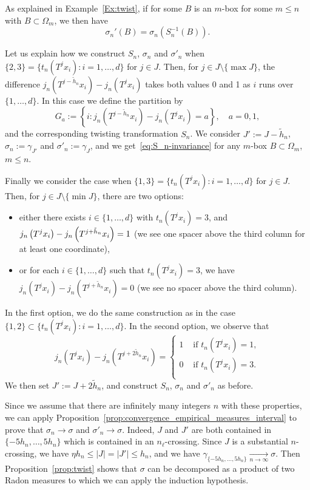 \documentclass[10pt]{amsart}
\theoremstyle{definition}\newtheorem{defi}[theo]{Definition}\newtheorem{rema}[theo]{Remark}\newtheorem{exam}[theo]{Example}\newtheorem{exem}[theo]{Example}\newtheorem{nota}[theo]{Notation}
\newcommand{\egdef}{:=}
\newcommand{\tend}[3][]{\xrightarrow[#2\to#3]{#1}}
\newcommand{\ovC}{\Omega}
\begin{document}
As explained in Example~\ref{Ex:twist}, if for some $B$ is an $m$-box for some $m\le n$ with $B\subset \ovC_m$, we then have
\begin{equation}\label{eq:S_n-invariance}
\sigma_n'(B)=\sigma_n(S_n^{-1}(B)).
\end{equation}


Let us explain how we construct $S_n$, $\sigma_n$ and $\sigma'_n$ when $\{2,3\}= \{t_n(T^j x_i):i=1,\ldots,d\}$ for $j\in J$. Then, for $j\in J\setminus\{\max J\}$, the difference $j_n\left(T^{j-\tilde h_n}x_i\right) - j_n\left(T^{j}x_i\right)$ takes both values 0 and 1 as $i$ runs over $\{1,\ldots,d\}$. In this case we define the partition by
\[
G_a\egdef \left\{i: j_n\left(T^{j-\tilde h_n}x_i\right) - j_n\left(T^{j}x_i\right) = a\right\}, \quad a=0,1,
\]
and the corresponding twisting transformation $S_n$. We consider $J'\egdef J-\tilde h_n$, $\sigma_n\egdef \gamma_{J'}$ and $\sigma'_n\egdef \gamma_{J}$, and we get~\eqref{eq:S_n-invariance} for any $m$-box $B\subset \ovC_m$, $m\le n$.

Finally we consider the case when $\{1,3\}= \{t_n(T^j x_i):i=1,\ldots,d\}$ for $j\in J$. Then, for $j\in J\setminus\{\min J\}$, there are two options:
\begin{itemize}
\item either there exists $i\in\{1,\ldots,d\}$ with $t_n(T^jx_i)=3$, and $j_n\left(T^{j}x_i\right) -\linebreak j_n\left(T^{j+\tilde h_n }x_i\right)=1$ (we see one spacer above the third column for at least one coordinate),
\item or for each $i\in\{1,\ldots,d\}$ such that $t_n(T^jx_i)=3$, we have $j_n\left(T^{j}x_i\right) - j_n\left(T^{j+\tilde h_n }x_i\right)=0$ (we see no spacer above the third column).
\end{itemize}
In the first option, we do the same construction as in the case $\{1,2\}\subset \{t_n(T^j x_i):i=1,\ldots,d\}$. In the second option, we observe that
\[
j_n\left(T^{j}x_i\right) - j_n\left(T^{j+2\tilde h_n }x_i\right) =
\begin{cases}
1 & \text{ if }t_n(T^jx_i)=1,\\
0 & \text{ if }t_n(T^jx_i)=3.\\
\end{cases}
\]
We then set $J'\egdef J+2\tilde h_n $, and construct $S_n$, $\sigma_n$ and $\sigma'_n$ as before.

Since we assume that there are infinitely many integers $n$ with these properties, we can apply Proposition~\ref{prop:convergence_empirical_measures_interval} to prove that $\sigma_n\to\sigma$ and $\sigma'_n\to\sigma$. Indeed, $J$ and $J'$ are both contained in $\{-5 h_n,\ldots,5 h_n\}$ which is contained in an $n_\ell$-crossing. Since $J$ is a substantial $n$-crossing, we have $\eta h_n\le |J|=|J'| \le h_n$, and we have $\gamma_{\{-5 h_n,\ldots,5 h_n\}}\tend{n}{\infty}\sigma$. Then Proposition~\ref{prop:twist} shows that $\sigma$ can be decomposed as a product of two Radon measures to which we can apply the induction hypothesis.
\end{document}
